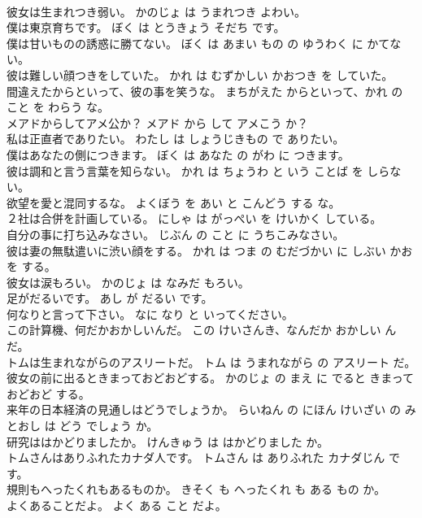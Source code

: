\documentclass[8pt]{extreport}
\begin{document}
\begin{CJK}{UTF8}{min}
\\	彼女は生まれつき弱い。	かのじょ は うまれつき よわい。	
\\	僕は東京育ちです。	ぼく は とうきょう そだち です。	
\\	僕は甘いものの誘惑に勝てない。	ぼく は あまい もの の ゆうわく に かてない。	
\\	彼は難しい顔つきをしていた。	かれ は むずかしい かおつき を していた。	
\\	間違えたからといって、彼の事を笑うな。	まちがえた からといって、かれ の こと を わらう な。	
\\	メアドからしてアメ公か？	メアド から して アメこう か？	
\\	私は正直者でありたい。	わたし は しょうじきもの で ありたい。	
\\	僕はあなたの側につきます。	ぼく は あなた の がわ に つきます。	
\\	彼は調和と言う言葉を知らない。	かれ は ちょうわ と いう ことば を しらない。	
\\	欲望を愛と混同するな。	よくぼう を あい と こんどう する な。	
\\	２社は合併を計画している。	にしゃ は がっぺい を けいかく している。	
\\	自分の事に打ち込みなさい。	じぶん の こと に うちこみなさい。	
\\	彼は妻の無駄遣いに渋い顔をする。	かれ は つま の むだづかい に しぶい かお を する。	
\\	彼女は涙もろい。	かのじょ は なみだ もろい。	
\\	足がだるいです。	あし が だるい です。	
\\	何なりと言って下さい。	なに なり と いってください。	
\\	この計算機、何だかおかしいんだ。	この けいさんき、なんだか おかしい んだ。	
\\	トムは生まれながらのアスリートだ。	トム は うまれながら の アスリート だ。	
\\	彼女の前に出るときまっておどおどする。	かのじょ の まえ に でると きまって おどおど する。	
\\	来年の日本経済の見通しはどうでしょうか。	らいねん の にほん けいざい の みとおし は どう でしょう か。	
\\	研究ははかどりましたか。	けんきゅう は はかどりました か。	
\\	トムさんはありふれたカナダ人です。	トムさん は ありふれた カナダじん です。	
\\	規則もへったくれもあるものか。	きそく も へったくれ も ある もの か。	
\\	よくあることだよ。	よく ある こと だよ。	

\end{CJK}
\end{document}
